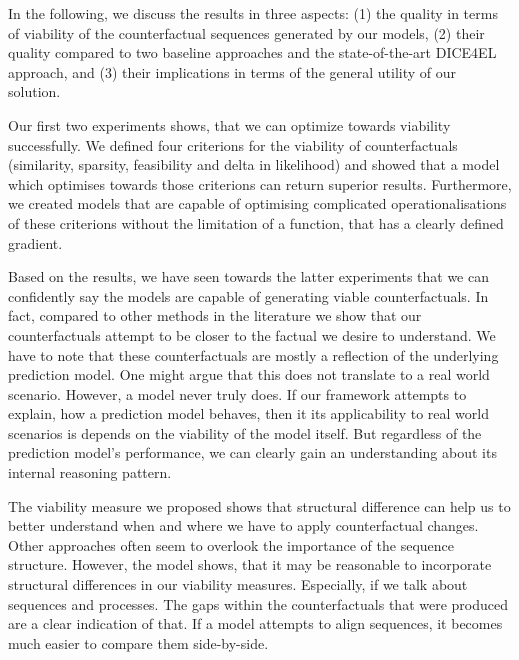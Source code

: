 \documentclass[./../../paper.tex]{subfiles}
\begin{document}
In the following, we discuss the results in three aspects: (1) the quality in terms of viability of the counterfactual sequences generated by our models, (2) their quality compared to two baseline approaches and the state-of-the-art DICE4EL approach, and (3) their implications in terms of the general utility of our solution.

Our first two experiments shows, that we can optimize towards viability successfully. We defined four criterions for the viability of counterfactuals (similarity, sparsity, feasibility and delta in likelihood) and showed that a model which optimises towards those criterions can return superior results. Furthermore, we created models that are capable of optimising complicated operationalisations of these criterions without the limitation of a function, that has a clearly defined gradient. 


Based on the results, we have seen towards the latter experiments that we can confidently say the models are capable of generating viable counterfactuals. In fact, compared to other methods in the literature we show that our counterfactuals attempt to be closer to the factual we desire to understand. We have to note that these counterfactuals are mostly a reflection of the underlying prediction model. One might argue that this does not translate to a real world scenario. However, a model never truly does. If our framework attempts to explain, how a prediction model behaves, then it its applicability to real world scenarios is depends on the viability of the model itself. But regardless of the prediction model's performance, we can clearly gain an understanding about its internal reasoning pattern.

The viability measure we proposed shows that structural difference can help us to better understand when and where we have to apply counterfactual changes. Other approaches often seem to overlook the importance of the sequence structure. However, the  model shows, that it may be reasonable to incorporate structural differences in our viability measures. Especially, if we talk about sequences and processes. The gaps within the counterfactuals that were produced are a clear indication of that. If a model attempts to align sequences, it becomes much easier to compare them side-by-side.  
\end{document}
